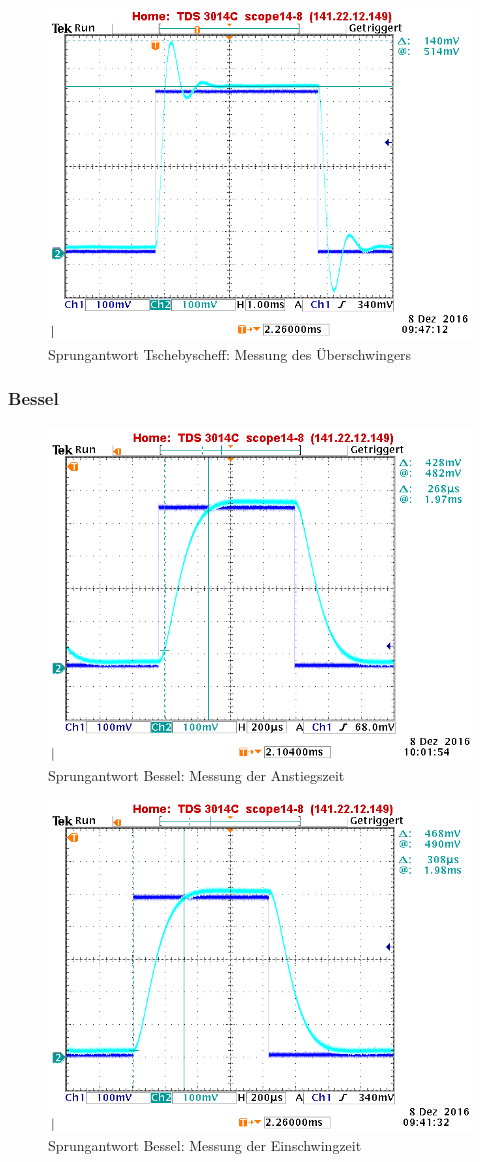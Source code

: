 \begin{figure}[h]
\centering
\includegraphics[width=0.60\linewidth]{Bilder/ImLabor/Sprungantwort_5_5_Tscheby_Ueberschwinger}
\caption{Sprungantwort Tschebyscheff: Messung des Überschwingers}
\label{fig:Sprungantwort_5_5_Tscheby_Ueberschwinger}
\end{figure}

\clearpage

\subsubsection{Bessel}

\begin{figure}[h]
\centering
\includegraphics[width=0.60\linewidth]{Bilder/ImLabor/Sprungantwort_5_1_Bessel_Anstiegszeit}
\caption{Sprungantwort Bessel: Messung der Anstiegszeit}
\label{fig:Sprungantwort_5_1_Bessel_Anstiegszeit_Anhang}
\end{figure}

\begin{figure}[h]
\centering
\includegraphics[width=0.60\linewidth]{Bilder/ImLabor/Sprungantwort_5_2_Bessel_Einschwingzeit}
\caption{Sprungantwort Bessel: Messung der Einschwingzeit}
\label{fig:Sprungantwort_5_2_Bessel_Einschwingzeit}
\end{figure}
